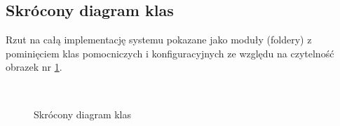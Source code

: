 \documentclass[a4paper,11pt]{report}
\begin{document}
\subsection{Skrócony diagram klas}
Rzut na całą implementację systemu pokazane jako moduły (foldery) z pominięciem klas pomocniczych i konfiguracyjnych ze względu na czytelność obrazek nr \ref{fig:gamitude_backend}.
\begin{figure}[H]
	\centering
	\\
	\caption{Skrócony diagram klas}
	\label{fig:gamitude_backend}
\end{figure}
\end{document}
